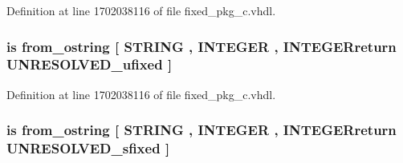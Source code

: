 Definition at line 1702038116 of file fixed\+\_\+pkg\+\_\+c.\+vhdl.

\hypertarget{classfixed__pkg_a25762bc17512150ae47c87f56611c70b}{}
\subsubsection[{from\+\_\+octal\+\_\+string}]{ {\bfseries \textcolor{keywordflow}{is}\textcolor{vhdlchar}{ }\textcolor{vhdlchar}{from\+\_\+ostring}\textcolor{vhdlchar}{ }\textcolor{vhdlchar}{\mbox{[}}\textcolor{vhdlchar}{ }\textcolor{comment}{S\+T\+R\+I\+N\+G}\textcolor{vhdlchar}{ }\textcolor{vhdlchar}{,}\textcolor{vhdlchar}{ }\textcolor{comment}{I\+N\+T\+E\+G\+E\+R}\textcolor{vhdlchar}{ }\textcolor{vhdlchar}{,}\textcolor{vhdlchar}{ }\textcolor{vhdlchar}{I\+N\+T\+E\+G\+E\+Rreturn}\textcolor{vhdlchar}{ }{\bfseries {\bf U\+N\+R\+E\+S\+O\+L\+V\+E\+D\+\_\+ufixed}} \textcolor{vhdlchar}{ }\textcolor{vhdlchar}{\mbox{]}}\textcolor{vhdlchar}{ }} \hspace{0.3cm}{\ttfamily [Alias]}}\label{classfixed__pkg_a25762bc17512150ae47c87f56611c70b}


Definition at line 1702038116 of file fixed\+\_\+pkg\+\_\+c.\+vhdl.

\hypertarget{classfixed__pkg_a77ae4ce46a979e96c632a390accfe9f8}{}
\subsubsection[{from\+\_\+octal\+\_\+string}]{ {\bfseries \textcolor{keywordflow}{is}\textcolor{vhdlchar}{ }\textcolor{vhdlchar}{from\+\_\+ostring}\textcolor{vhdlchar}{ }\textcolor{vhdlchar}{\mbox{[}}\textcolor{vhdlchar}{ }\textcolor{comment}{S\+T\+R\+I\+N\+G}\textcolor{vhdlchar}{ }\textcolor{vhdlchar}{,}\textcolor{vhdlchar}{ }\textcolor{comment}{I\+N\+T\+E\+G\+E\+R}\textcolor{vhdlchar}{ }\textcolor{vhdlchar}{,}\textcolor{vhdlchar}{ }\textcolor{vhdlchar}{I\+N\+T\+E\+G\+E\+Rreturn}\textcolor{vhdlchar}{ }{\bfseries {\bf U\+N\+R\+E\+S\+O\+L\+V\+E\+D\+\_\+sfixed}} \textcolor{vhdlchar}{ }\textcolor{vhdlchar}{\mbox{]}}\textcolor{vhdlchar}{ }} \hspace{0.3cm}{\ttfamily [Alias]}}\label{classfixed__pkg_a77ae4ce46a979e96c632a390accfe9f8}


